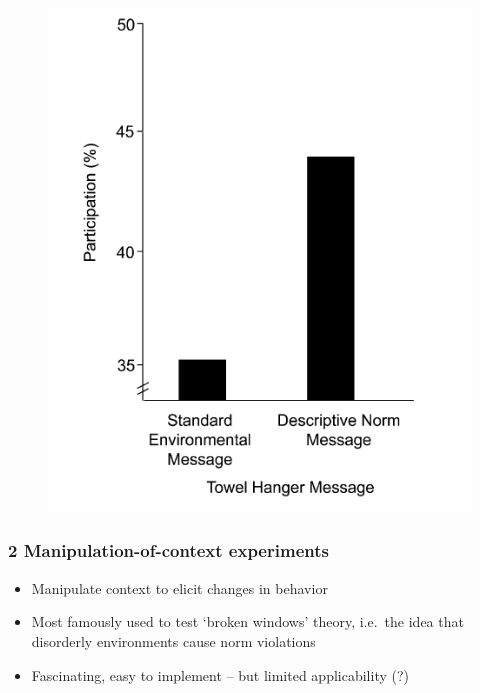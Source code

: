 \documentclass[12pt,english,dvipsnames,aspectratio=169,handout]{beamer}\usepackage[]{graphicx}\usepackage[]{xcolor}
\begin{document}
\begin{frame}
\begin{figure}[ht]
\begin{minipage}[b]{0.4\linewidth}
            \includegraphics[width=\textwidth]{../04-figures/12/10-w12_nudge13}
        \end{minipage}
    \end{figure}
\end{frame}


\begin{frame}
	\frametitle{2 Manipulation-of-context experiments}
	\footnotesize
\begin{itemize}
  \item Manipulate context to elicit changes in behavior
  \item Most famously used to test `broken windows' theory, i.e.\ the idea that disorderly environments cause norm violations
  \item Fascinating, easy to implement -- but limited applicability (?)
\end{itemize}
\vspace{3cm}
\end{frame}
\end{document}

